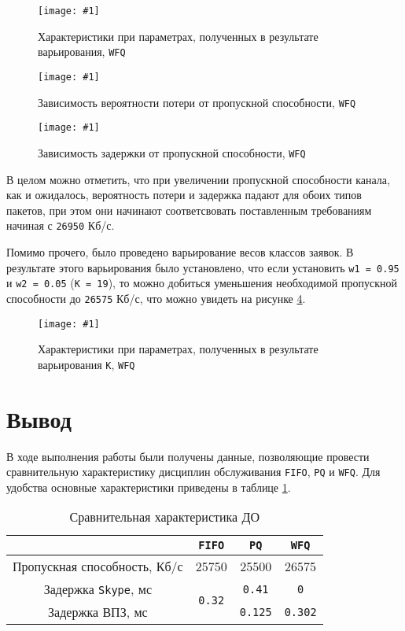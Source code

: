 \documentclass[12pt, a4paper]{article}
\newcommand{\figc}[4]{
  \begin{figure}[H]
  \begin{center}
    \texttt{[image: \#1]}
    \caption{#2}
    \label{fig:#3}
  \end{center}
  \end{figure}
}
\begin{document}
\figc{wfq/C26_95E10WFQ}{Характеристики при параметрах, полученных в результате варьирования, \texttt{WFQ}}{w_c}{1.0}
\figc{charts/wfq_loss}{Зависимость вероятности потери от пропускной способности, \texttt{WFQ}}{w_l}{0.8}
\figc{charts/wfq_delay}{Зависимость задержки от пропускной способности, \texttt{WFQ}}{w_d}{0.8}

В целом можно отметить, что при увеличении пропускной способности канала, как
и ожидалось, вероятность потери и задержка падают для обоих типов пакетов,
при этом они начинают соответсвовать поставленным требованиям начиная с \texttt{26950} Кб/с.

Помимо прочего, было проведено варьирование весов классов заявок. В результате этого варьирования
было установлено, что если установить \texttt{w1 = 0.95} и \texttt{w2 = 0.05} (\texttt{K = 19}),
то можно добиться уменьшения необходимой пропускной способности до \texttt{26575} Кб/с,
что можно увидеть на рисунке \ref{fig:w_k}.

\figc{wfq/C26_575E10WFQ_modified}{Характеристики при параметрах, полученных в результате варьирования \texttt{K}, \texttt{WFQ}}{w_k}{1.0}

\section{Вывод}

В ходе выполнения работы были получены данные, позволяющие провести сравнительную
характеристику дисциплин обслуживания \texttt{FIFO}, \texttt{PQ} и \texttt{WFQ}.
Для удобства основные характеристики приведены в таблице \ref{Tab:res}.

\begin{table}[H]
  \begin{center}
  \caption{Сравнительная характеристика ДО}
  \begin{tabular}{| c | c | c | c |}
    \hline
    & \texttt{FIFO} & \texttt{PQ} & \texttt{WFQ}\\\hline
    Пропускная способность, Кб/с & 25750 & 25500 & 26575\\\hline
    Задержка \texttt{Skype}, мс & \multirow{2}{*}{\texttt{0.32}} & \texttt{0.41} & \texttt{0}\\
    \cline{1-1} \cline{3-4}
    Задержка ВПЗ, мс & & \texttt{0.125} & \texttt{0.302}\\\hline
  \end{tabular}
  \label{Tab:res}
  \end{center}
\end{table}
\end{document}
